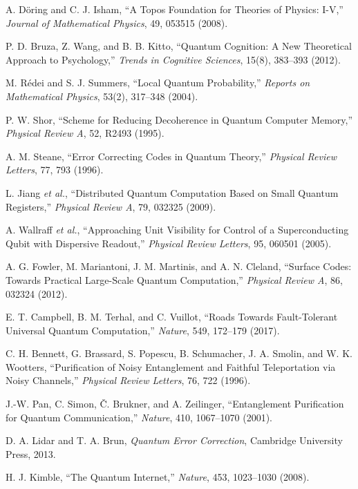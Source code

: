 \documentclass[11pt]{article}
\begin{document}
\begin{thebibliography}{99}
 A. D\"oring and C. J. Isham, ``A Topos Foundation for Theories of Physics: I-V,'' \emph{Journal of Mathematical Physics}, 49, 053515 (2008).

 P. D. Bruza, Z. Wang, and B. B. Kitto, ``Quantum Cognition: A New Theoretical Approach to Psychology,'' \emph{Trends in Cognitive Sciences}, 15(8), 383–393 (2012).

 M. R\'edei and S. J. Summers, ``Local Quantum Probability,'' \emph{Reports on Mathematical Physics}, 53(2), 317–348 (2004).

 P. W. Shor, ``Scheme for Reducing Decoherence in Quantum Computer Memory,'' \emph{Physical Review A}, 52, R2493 (1995).

 A. M. Steane, ``Error Correcting Codes in Quantum Theory,'' \emph{Physical Review Letters}, 77, 793 (1996).

 L. Jiang \emph{et al.}, ``Distributed Quantum Computation Based on Small Quantum Registers,'' \emph{Physical Review A}, 79, 032325 (2009).

 A. Wallraff \emph{et al.}, ``Approaching Unit Visibility for Control of a Superconducting Qubit with Dispersive Readout,'' \emph{Physical Review Letters}, 95, 060501 (2005).

 A. G. Fowler, M. Mariantoni, J. M. Martinis, and A. N. Cleland, ``Surface Codes: Towards Practical Large-Scale Quantum Computation,'' \emph{Physical Review A}, 86, 032324 (2012).

 E. T. Campbell, B. M. Terhal, and C. Vuillot, ``Roads Towards Fault-Tolerant Universal Quantum Computation,'' \emph{Nature}, 549, 172–179 (2017).

 C. H. Bennett, G. Brassard, S. Popescu, B. Schumacher, J. A. Smolin, and W. K. Wootters, ``Purification of Noisy Entanglement and Faithful Teleportation via Noisy Channels,'' \emph{Physical Review Letters}, 76, 722 (1996).

 J.-W. Pan, C. Simon, \v{C}. Brukner, and A. Zeilinger, ``Entanglement Purification for Quantum Communication,'' \emph{Nature}, 410, 1067–1070 (2001).

 D. A. Lidar and T. A. Brun, \emph{Quantum Error Correction}, Cambridge University Press, 2013.

 H. J. Kimble, ``The Quantum Internet,'' \emph{Nature}, 453, 1023–1030 (2008).


\end{thebibliography}
\end{document}
